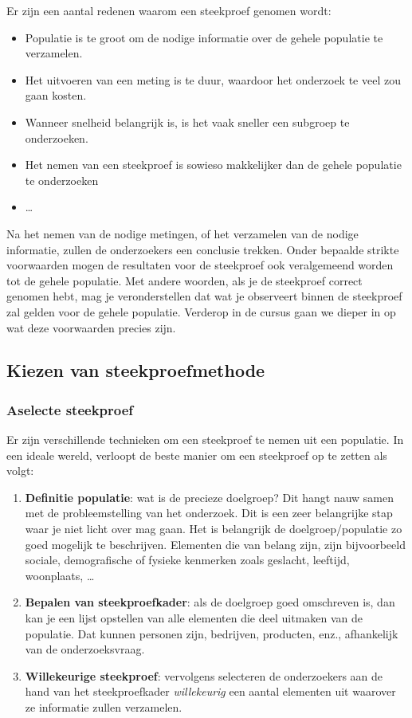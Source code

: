 Er zijn een aantal redenen waarom een steekproef genomen wordt:

\begin{itemize}
  \item Populatie is te groot om de nodige informatie over de gehele populatie te verzamelen.
  \item Het uitvoeren van een meting is te duur, waardoor het onderzoek te veel zou gaan kosten.
  \item Wanneer snelheid belangrijk is, is het vaak sneller een subgroep te onderzoeken.
  \item Het nemen van een steekproef is sowieso makkelijker dan de gehele populatie te onderzoeken
  \item \dots
\end{itemize}

Na het nemen van de nodige metingen, of het verzamelen van de nodige informatie, zullen de onderzoekers een conclusie trekken. Onder bepaalde strikte voorwaarden mogen de resultaten voor de steekproef ook veralgemeend worden tot de gehele populatie. Met andere woorden, als je de steekproef correct genomen hebt, mag je veronderstellen dat wat je observeert binnen de steekproef zal gelden voor de gehele populatie. Verderop in de cursus gaan we dieper in op wat deze voorwaarden precies zijn.

\subsection{Kiezen van steekproefmethode}

\subsubsection{Aselecte steekproef}

Er zijn verschillende technieken om een steekproef te nemen uit een populatie. In een ideale wereld, verloopt de beste manier om een steekproef op te zetten als volgt:

\begin{enumerate}
  \item \textbf{Definitie populatie}: wat is de precieze doelgroep? Dit hangt nauw samen met de probleemstelling van het onderzoek. Dit is een zeer belangrijke stap waar je niet licht over mag gaan. Het is belangrijk de doelgroep/populatie zo goed mogelijk te beschrijven. Elementen die van belang zijn, zijn bijvoorbeeld sociale, demografische of fysieke kenmerken zoals geslacht, leeftijd, woonplaats, \dots
  \item \textbf{Bepalen van steekproefkader}: als de doelgroep goed omschreven is, dan kan je een lijst opstellen van alle elementen die deel uitmaken van de populatie. Dat kunnen personen zijn, bedrijven, producten, enz., afhankelijk van de onderzoeksvraag.
  \item \textbf{Willekeurige steekproef}: vervolgens selecteren de onderzoekers aan de hand van het steekproefkader \textit{willekeurig} een aantal elementen uit waarover ze informatie zullen verzamelen.
\end{enumerate}

